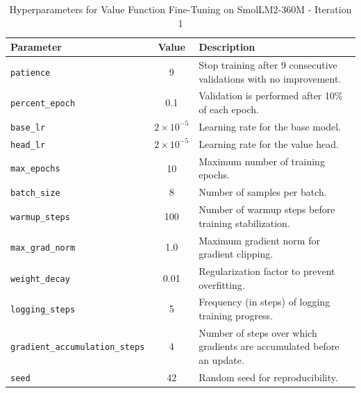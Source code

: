 \documentclass{article}
\begin{document}
\begin{table}[ht]
\centering
\begin{tabular}{@{}l c p{8cm}@{}}
\toprule
\textbf{Parameter}               & \textbf{Value}        & \textbf{Description} \\ \midrule
\texttt{patience}                & 9                     & Stop training after 9 consecutive validations with no improvement. \\[0.5em]
\texttt{percent\_epoch}          & 0.1                   & Validation is performed after 10\% of each epoch. \\[0.5em]
\texttt{base\_lr}                & $2\times10^{-5}$      & Learning rate for the base model. \\[0.5em]
\texttt{head\_lr}                & $2\times10^{-5}$      & Learning rate for the value head. \\[0.5em]
\texttt{max\_epochs}             & 10                    & Maximum number of training epochs. \\[0.5em]
\texttt{batch\_size}             & 8                     & Number of samples per batch. \\[0.5em]
\texttt{warmup\_steps}           & 100                   & Number of warmup steps before training stabilization. \\[0.5em]
\texttt{max\_grad\_norm}         & 1.0                   & Maximum gradient norm for gradient clipping. \\[0.5em]
\texttt{weight\_decay}           & 0.01                  & Regularization factor to prevent overfitting. \\[0.5em]
\texttt{logging\_steps}          & 5                     & Frequency (in steps) of logging training progress. \\[0.5em]
\texttt{gradient\_accumulation\_steps} & 4              & Number of steps over which gradients are accumulated before an update. \\[0.5em]
\texttt{seed}                    & 42                    & Random seed for reproducibility. \\ \bottomrule
\end{tabular}
\caption{Hyperparameters for Value Function Fine-Tuning on SmolLM2-360M - Iteration 1}
\label{tab:hyperparams360}
\end{table}
\end{document}
